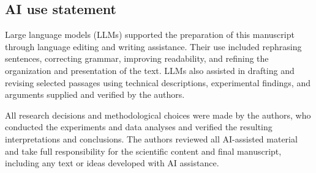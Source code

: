 \subsection*{AI use statement}

Large language models (LLMs) supported the preparation of this manuscript through language editing and writing assistance. Their use included rephrasing sentences, correcting grammar, improving readability, and refining the organization and presentation of the text. LLMs also assisted in drafting and revising selected passages using technical descriptions, experimental findings, and arguments supplied and verified by the authors.

All research decisions and methodological choices were made by the authors, who conducted the experiments and data analyses and verified the resulting interpretations and conclusions. The authors reviewed all AI-assisted material and take full responsibility for the scientific content and final manuscript, including any text or ideas developed with AI assistance.
